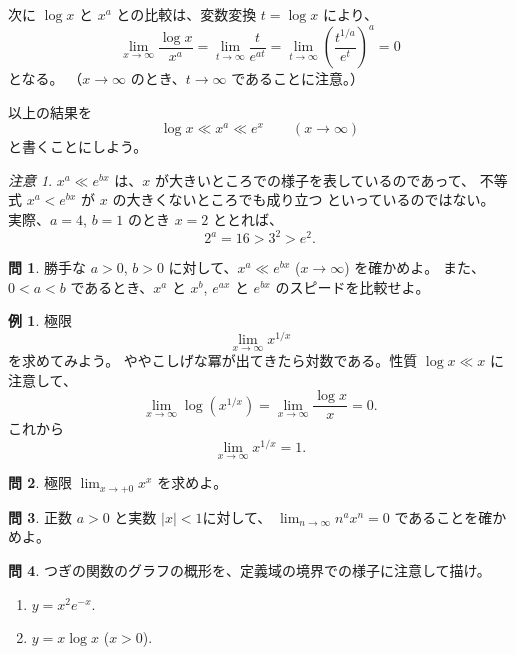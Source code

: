 \documentclass[a4paper]{jsarticle}
\theoremstyle{definition}
\newtheorem{Example}[Theorem]{例}
\newtheorem{Exercise}{問}%
\theoremstyle{remark}
\newtheorem{Remark}{注意}
\begin{document}
次に $\log x$ と $x^a$ との比較は、変数変換 $t = \log x$ により、
\[
\lim_{x\to \infty} \frac{\log x}{x^a} =
\lim_{t \to \infty} \frac{t}{e^{at}} = 
\lim_{t \to \infty} \left( \frac{t^{1/a}}{e^t} \right)^a
= 0
\]
となる。
（$x \to \infty$ のとき、$t \to \infty$ であることに注意。）

以上の結果を
\[
\log x \ll x^a \ll e^x\qquad(x \to \infty)
\]
と書くことにしよう。

\begin{Remark}
{\small
$x^a \ll e^{bx}$ は、$x$ が大きいところでの様子を表しているのであって、
不等式 $x^a < e^{bx}$ が $x$ の大きくないところでも成り立つ
といっているのではない。
実際、$a=4$, $b=1$ のとき $x=2$ ととれば、
\[
2^a = 16 > 3^2 > e^2.
\]
}
\end{Remark}

\begin{Exercise}
勝手な $a>0$, $b > 0$ に対して、$x^a \ll e^{bx}$
($x \to \infty$) を確かめよ。
また、$0 < a < b$ であるとき、$x^a$ と $x^b$, $e^{ax}$ と $e^{bx}$ のスピードを比較せよ。
\end{Exercise}

\begin{Example} 極限
  \[
    \lim_{x \to \infty}x^{1/x}
  \]
を求めてみよう。
ややこしげな冪が出てきたら対数である。性質 $\log x \ll x$ に注意して、
\[
\lim_{x \to \infty} \log(x^{1/x}) =
\lim_{x \to \infty} \frac{\log x}{x} = 0. 
\]
これから
\[
\lim_{x \to \infty} x^{1/x} = 1. 
\]
\end{Example}

\begin{Exercise} 極限
$\displaystyle 
\lim_{x \to +0} x^x
$
を求めよ。
\end{Exercise}

\begin{Exercise}
正数 $a>0$ と実数 $|x| < 1$に対して、
$\displaystyle 
\lim_{n \to \infty} n^ax^n = 0 
$
であることを確かめよ。
\end{Exercise}

\begin{Exercise}
つぎの関数のグラフの概形を、定義域の境界での様子に注意して描け。
\begin{enumerate}
\item 
$y = x^2 e^{-x}$. 
\item 
$y = x\log x$ ($x>0$). 
\end{enumerate}
\end{Exercise}

\end{document}
